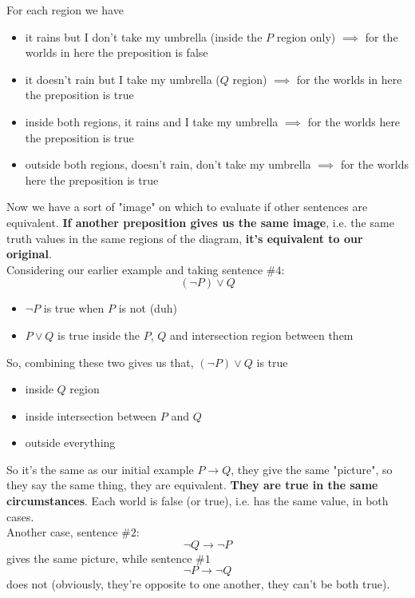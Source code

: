 	For each region we have
	\begin{itemize}
		\item it rains but I don't take my umbrella (inside the $P$ region only) $\implies$ for the worlds in here the preposition is false
		\item it doesn't rain but I take my umbrella ($Q$ region) $\implies$ for the worlds in here the preposition is true
		\item inside both regions, it rains and I take my umbrella $\implies$ for the worlds here the preposition is true
		\item outside both regions, doesn't rain, don't take my umbrella $\implies$ for the worlds here the preposition is true
	\end{itemize}
	Now we have a sort of "image" on which to evaluate if other sentences are equivalent. \textbf{If another preposition gives us the same image}, i.e. the same truth values in the same regions of the diagram, \textbf{it's equivalent to our original}. \\


	Considering our earlier example and taking sentence $\#4$:
	$$ (\neg P) \vee Q $$
	\begin{itemize}
		\item $\neg P$ is true when $P$ is not (duh)
		\item $P \vee Q$ is true inside the $P$, $Q$ and intersection region between them
	\end{itemize}

	So, combining these two gives us that, $(\neg P) \vee Q$ is true
	\begin{itemize}
		\item inside $Q$ region
		\item inside intersection between $P$ and $Q$
		\item outside everything
	\end{itemize}

	So it's the same as our initial example $P \rightarrow Q$, they give the same "picture", so they say the same thing, they are equivalent. \textbf{They are true in the same circumstances}. Each world is false (or true), i.e. has the same value, in both cases.\\

	Another case, sentence $\#2$:
	$$ \neg Q \rightarrow \neg P$$
	gives the same picture, while sentence $\# 1$
	$$ \neg P \rightarrow \neg Q$$
	does not (obviously, they're opposite to one another, they can't be both true).\\

